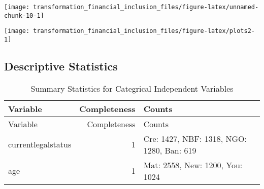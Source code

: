 \documentclass[
]{article}
\begin{document}
\newpage

\begin{center}\texttt{[image: transformation\_financial\_inclusion\_files/figure-latex/unnamed-chunk-10-1]} \end{center}

\newpage

\begin{center}\texttt{[image: transformation\_financial\_inclusion\_files/figure-latex/plots2-1]} \end{center}

\newpage

\hypertarget{descriptive-statistics}{%
\subsection{\texorpdfstring{\textbf{Descriptive
Statistics}}{Descriptive Statistics}}\label{descriptive-statistics}}

\begin{longtable}[]{@{}lrl@{}}
\caption{Summary Statistics for Categrical Independent
Variables}\tabularnewline
\toprule
Variable & Completeness & Counts\tabularnewline
\midrule
\endfirsthead
\toprule
Variable & Completeness & Counts\tabularnewline
\midrule
\endhead
currentlegalstatus & 1 & Cre: 1427, NBF: 1318, NGO: 1280, Ban:
619\tabularnewline
age & 1 & Mat: 2558, New: 1200, You: 1024\tabularnewline
\bottomrule
\end{longtable}
\end{document}
